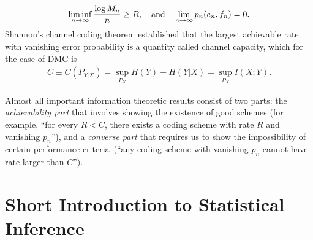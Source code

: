 \documentclass[12pt]{article}
\begin{document}
\begin{align}
\liminf_{n \to \infty} \frac{\log M_n}{n} \geq R, \quad \text{and} \quad \lim_{n \to \infty} p_{n}(e_n, f_n) = 0. 
\end{align}
Shannon's channel coding theorem established that the largest achievable rate with vanishing error probability is a quantity called channel capacity, which for the case of DMC is 
\begin{align}
C \equiv C(P_{Y|X}) = \sup_{P_X} H(Y) - H(Y|X) = \sup_{P_X} I(X; Y). 
\end{align}
\begin{remark}
Almost all important information theoretic results consist of two parts: the \emph{achievability part} that involves showing the existence of good schemes (for example, ``for every $R<C$, there exists a coding scheme with rate $R$ and vanishing $p_n$''), and a \emph{converse part} that requires us to show the impossibility of certain performance criteria~(``any coding scheme with vanishing $p_n$ cannot have rate larger than $C$''). 
\end{remark}


\section{Short Introduction to Statistical Inference}
\label{section:short-intro-statistical-inference}
\end{document}
